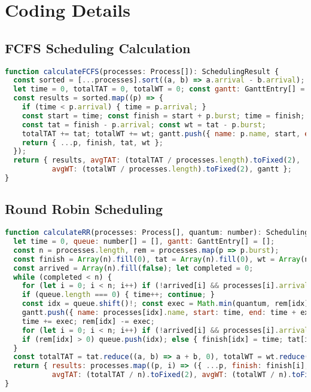 \documentclass[12pt,a4paper,oneside]{report}
\begin{document}
\section{Coding Details}
\subsection*{FCFS Scheduling Calculation}
\begin{lstlisting}[language=JavaScript, caption={FCFS schedule calculation (excerpt from \texttt{src/app/fcfs/page.tsx}).}]
function calculateFCFS(processes: Process[]): SchedulingResult {
  const sorted = [...processes].sort((a, b) => a.arrival - b.arrival);
  let time = 0, totalTAT = 0, totalWT = 0; const gantt: GanttEntry[] = [];
  const results = sorted.map((p) => {
    if (time < p.arrival) { time = p.arrival; }
    const start = time; const finish = start + p.burst; time = finish;
    const tat = finish - p.arrival; const wt = tat - p.burst;
    totalTAT += tat; totalWT += wt; gantt.push({ name: p.name, start, end: finish });
    return { ...p, finish, tat, wt };
  });
  return { results, avgTAT: (totalTAT / processes.length).toFixed(2),
           avgWT: (totalWT / processes.length).toFixed(2), gantt };
}
\end{lstlisting}

\subsection*{Round Robin Scheduling}
\begin{lstlisting}[language=JavaScript, caption={Round Robin calculation (excerpt from \texttt{src/app/round-robin/page.tsx}).}]
function calculateRR(processes: Process[], quantum: number): SchedulingResult {
  let time = 0, queue: number[] = [], gantt: GanttEntry[] = [];
  const n = processes.length, rem = processes.map(p => p.burst);
  const finish = Array(n).fill(0), tat = Array(n).fill(0), wt = Array(n).fill(0);
  const arrived = Array(n).fill(false); let completed = 0;
  while (completed < n) {
    for (let i = 0; i < n; i++) if (!arrived[i] && processes[i].arrival <= time) { queue.push(i); arrived[i] = true; }
    if (queue.length === 0) { time++; continue; }
    const idx = queue.shift()!; const exec = Math.min(quantum, rem[idx]);
    gantt.push({ name: processes[idx].name, start: time, end: time + exec });
    time += exec; rem[idx] -= exec;
    for (let i = 0; i < n; i++) if (!arrived[i] && processes[i].arrival <= time) { queue.push(i); arrived[i] = true; }
    if (rem[idx] > 0) queue.push(idx); else { finish[idx] = time; tat[idx] = finish[idx] - processes[idx].arrival; wt[idx] = tat[idx] - processes[idx].burst; completed++; }
  }
  const totalTAT = tat.reduce((a, b) => a + b, 0), totalWT = wt.reduce((a, b) => a + b, 0);
  return { results: processes.map((p, i) => ({ ...p, finish: finish[i], tat: tat[i], wt: wt[i] })),
           avgTAT: (totalTAT / n).toFixed(2), avgWT: (totalWT / n).toFixed(2), gantt };
}
\end{lstlisting}
\end{document}
